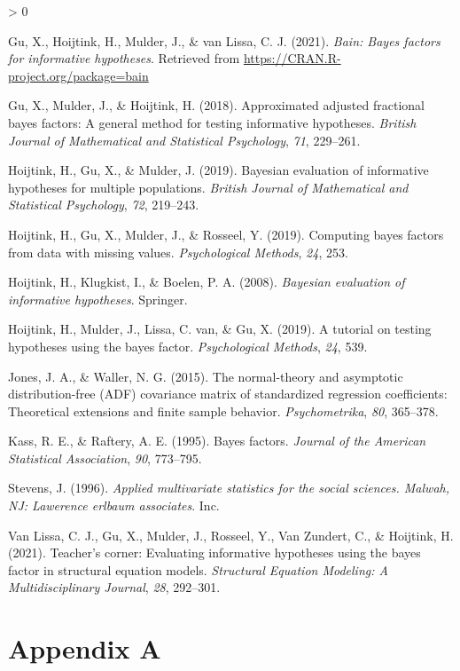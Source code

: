 \documentclass[
]{book}
\newlength{\cslhangindent}
\newenvironment{CSLReferences}[2] %
 {%
  \setlength{\parindent}{0pt}
  \ifodd #1 \everypar{\setlength{\hangindent}{\cslhangindent}}\ignorespaces\fi
  \ifnum #2 > 0
  \setlength{\parskip}{#2\baselineskip}
  \fi
 }%
 {}
\begin{document}
\hypertarget{refs}{}
\begin{CSLReferences}{1}{0}
\leavevmode\hypertarget{ref-bain}{}%
Gu, X., Hoijtink, H., Mulder, J., \& van Lissa, C. J. (2021). \emph{Bain: Bayes factors for informative hypotheses}. Retrieved from \url{https://CRAN.R-project.org/package=bain}

\leavevmode\hypertarget{ref-gu2018approximated}{}%
Gu, X., Mulder, J., \& Hoijtink, H. (2018). Approximated adjusted fractional bayes factors: A general method for testing informative hypotheses. \emph{British Journal of Mathematical and Statistical Psychology}, \emph{71}, 229--261.

\leavevmode\hypertarget{ref-hoijtink2019bayesian}{}%
Hoijtink, H., Gu, X., \& Mulder, J. (2019). Bayesian evaluation of informative hypotheses for multiple populations. \emph{British Journal of Mathematical and Statistical Psychology}, \emph{72}, 219--243.

\leavevmode\hypertarget{ref-hoijtink2019computing}{}%
Hoijtink, H., Gu, X., Mulder, J., \& Rosseel, Y. (2019). Computing bayes factors from data with missing values. \emph{Psychological Methods}, \emph{24}, 253.

\leavevmode\hypertarget{ref-hoijtink2008bayesian}{}%
Hoijtink, H., Klugkist, I., \& Boelen, P. A. (2008). \emph{Bayesian evaluation of informative hypotheses}. Springer.

\leavevmode\hypertarget{ref-hoijtink2019tutorial}{}%
Hoijtink, H., Mulder, J., Lissa, C. van, \& Gu, X. (2019). A tutorial on testing hypotheses using the bayes factor. \emph{Psychological Methods}, \emph{24}, 539.

\leavevmode\hypertarget{ref-jones2015normal}{}%
Jones, J. A., \& Waller, N. G. (2015). The normal-theory and asymptotic distribution-free (ADF) covariance matrix of standardized regression coefficients: Theoretical extensions and finite sample behavior. \emph{Psychometrika}, \emph{80}, 365--378.

\leavevmode\hypertarget{ref-kass1995bayes}{}%
Kass, R. E., \& Raftery, A. E. (1995). Bayes factors. \emph{Journal of the American Statistical Association}, \emph{90}, 773--795.

\leavevmode\hypertarget{ref-stevens1996applied}{}%
Stevens, J. (1996). \emph{Applied multivariate statistics for the social sciences. Malwah, NJ: Lawerence erlbaum associates}. Inc.

\leavevmode\hypertarget{ref-van2021teacher}{}%
Van Lissa, C. J., Gu, X., Mulder, J., Rosseel, Y., Van Zundert, C., \& Hoijtink, H. (2021). Teacher's corner: Evaluating informative hypotheses using the bayes factor in structural equation models. \emph{Structural Equation Modeling: A Multidisciplinary Journal}, \emph{28}, 292--301.

\end{CSLReferences}

\hypertarget{appendix-appendix}{%
\appendix}


\hypertarget{appendix-a}{%
\chapter*{Appendix A}\label{appendix-a}}
\end{document}
